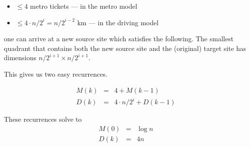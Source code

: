 \begin{itemize}
\begin{itemize}
\item
$\leq 4$ metro tickets --- in the metro model
\item
$\leq 4 \cdot n/2^i = n/2^{i-2}$ km --- in the driving model
\end{itemize}
one can arrive at a new source site which satisfies the following.  The smallest quadrant that contains both the new source site and the (original) target site has dimensions $n/2^{i+1} \times n/2^{i+1}$.

This gives us two easy recurrences.

\begin{eqnarray*}
M(k) & = & 4 + M(k-1) \\
D(k)  & = & 4 \cdot n/2^i + D(k-1)
\end{eqnarray*}

These recurrences solve to 
\begin{eqnarray*}
M(0) & = & \log n \\
D(k)  & = & 4 n
\end{eqnarray*}


\end{itemize}
